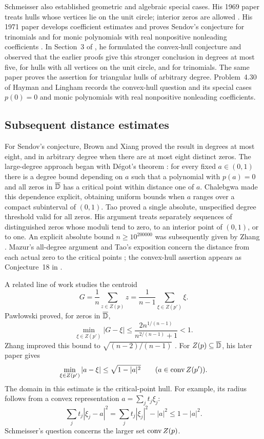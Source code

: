 Schmeisser also established geometric and algebraic special cases.
His 1969 paper treats hulls whose vertices lie on the unit circle;
interior zeros are allowed \cite{Schmeisser1969}. His 1971 paper
develops coefficient estimates and proves Sendov's conjecture for
trinomials and for monic polynomials with real nonpositive
nonleading coefficients \cite{Schmeisser1971}. In Section~3 of
\cite{Schmeisser1977}, he formulated the convex-hull conjecture and
observed that the earlier proofs give this stronger conclusion in
degrees at most five, for hulls with all vertices on the unit circle,
and for trinomials. The same paper proves the assertion for triangular
hulls of arbitrary degree. Problem~4.30 of Hayman and Lingham
\cite{HaymanLingham} records the convex-hull question and its special
cases $p(0)=0$ and monic polynomials with real nonpositive
nonleading coefficients.

\subsection{Subsequent distance estimates}

For Sendov's conjecture, Brown and Xiang \cite{BrownXiang1999}
proved the result in degrees at most eight, and in arbitrary degree
when there are at most eight distinct zeros. The large-degree
approach began with D\'egot's theorem \cite{Degot}: for every fixed
$a\in(0,1)$ there is a degree bound depending on $a$ such that
a polynomial with $p(a)=0$ and all zeros in $\overline{\mathbb D}$ has
a critical point within distance one of $a$. Chalebgwa
\cite{Chalebgwa} made this dependence explicit, obtaining uniform
bounds when $a$ ranges over a compact subinterval of $(0,1)$.
Tao \cite{Tao2022} proved a single absolute, unspecified degree
threshold valid for all zeros. His argument treats separately
sequences of distinguished zeros whose moduli tend to zero,
to an interior point of $(0,1)$, or to one. An explicit absolute
bound $n\ge10^{200000}$ was subsequently given by Zhang
\cite{ZhangExplicit}. Mazur's all-degree argument and Tao's
exposition concern the distance from each actual zero to the
critical points \cite{Mazur,Tao2026}; the convex-hull assertion
appears as Conjecture~18 in \cite{Tao2026}.

A related line of work studies the centroid
\[
 G=\frac1n\sum_{z\in Z(p)}z
   =\frac1{n-1}\sum_{\xi\in Z(p')}\xi.
\]
Paw{\l}owski \cite{Pawlowski} proved, for zeros in $\overline{\mathbb D}$,
\[
 \min_{\xi\in Z(p')}|G-\xi|
 \le\frac{2n^{1/(n-1)}}{n^{2/(n-1)}+1}<1.
\]
Zhang improved this bound to $\sqrt{(n-2)/(n-1)}$
\cite{ZhangCentroid}. For $Z(p)\subseteq\overline{\mathbb D}$, his later paper
\cite{ZhangHull} gives
\[
 \min_{\xi\in Z(p')}|a-\xi|\le\sqrt{1-|a|^2}
       \qquad(a\in\operatorname{conv} Z(p')).
\]
The domain in this estimate is the critical-point hull.
For example, its radius follows from a convex representation
$a=\sum_j t_j\xi_j$:
\[
 \sum_j t_j|\xi_j-a|^2
 =\sum_j t_j|\xi_j|^2-|a|^2\le1-|a|^2.
\]
Schmeisser's question concerns the larger set $\operatorname{conv} Z(p)$.

